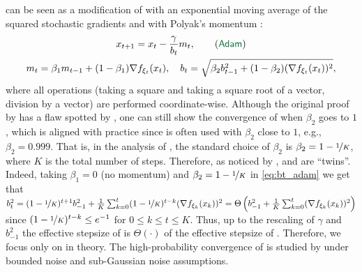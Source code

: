 \documentclass{article}
\begin{document}
 \citep{kingma2014adam} can be seen as a modification of  with an exponential moving average  of the squared stochastic gradients 
and with Polyak's momentum \citep{polyak1964some}:
\begin{gather}
    x_{t+1} = x_t - \frac{\gamma}{b_t} m_t, \tag{\algname{Adam}} \label{eq:adam}\\
    m_t = \beta_1 m_{t-1} + (1-\beta_1)\nabla f_{\xi_t}(x_t),\quad   b_t = \sqrt{\beta_2 b_{t-1}^2 + (1-\beta_2)(\nabla f_{\xi_t}(x_t))^2}, \label{eq:bt_adam}
\end{gather}
where all operations (taking a square and taking a square root of a vector, division by a vector) are performed coordinate-wise. Although the original proof by \citet{kingma2014adam} has a flaw spotted by \citet{reddi2019convergence}, one can still show the convergence of  when $\beta_2$ goes to $1$ \citep{defossez2022simple, zhang2022adam, wang2022provable}, which is aligned with practice since  is often used with $\beta_2$ close to $1$, e.g., $\beta_2 = 0.999$. That is, in the analysis of , the standard choice of $\beta_2$ is $\beta_2 = 1 - \nicefrac{1}{K}$, where $K$ is the total number of steps. Therefore, as noticed by \citet{defossez2022simple},  and  are ``twins''. Indeed, taking $\beta_1 = 0$ (no momentum) and $\beta_2 = 1 - \nicefrac{1}{K}$ in \eqref{eq:bt_adam} we get that $b_t^2 = (1 - \nicefrac{1}{K})^{t+1}b_{-1}^2 + \frac{1}{K}\sum_{k=0}^{t}(1 - \nicefrac{1}{K})^{t-k}(\nabla f_{\xi_k}(x_k))^2 = \Theta\left(b_{-1}^2 + \frac{1}{K}\sum_{k=0}^{t}(\nabla f_{\xi_k}(x_k))^2\right)$ since $(1 - \nicefrac{1}{K})^{t-k} \leq e^{-1}$ for $0 \leq k \leq t \leq K$. Thus, up to the rescaling of $\gamma$ and $b_{-1}^2$ the effective stepsize of  is $\Theta(\cdot)$ of the effective stepsize of  . Therefore, we focus only on  in theory. The high-probability convergence of  is studied by \citet{li2023convergence} under bounded noise and sub-Gaussian noise assumptions.

\end{document}
